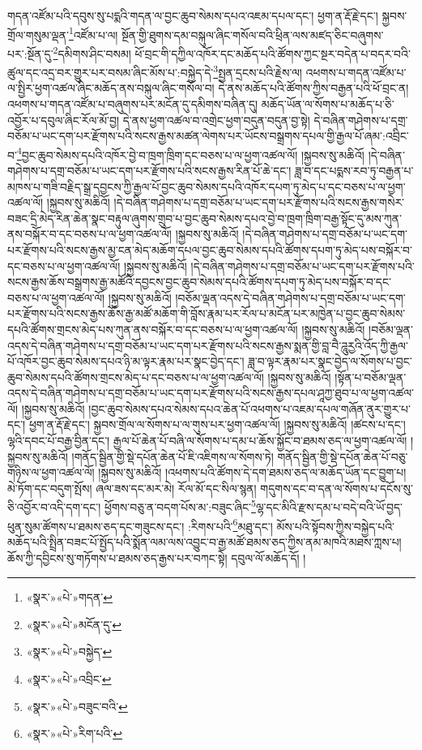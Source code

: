 གདན་འཛོམ་པའི་དབུས་སུ་པདྨའི་གདན་ལ་བྱང་ཆུབ་སེམས་དཔའ་འཇམ་དཔལ་དང་། ཕྱག་ན་རྡོ་རྗེ་དང་། སྐྱབས་གྲོལ་གསུམ་ལྡན་\footnote{«སྣར་»«པེ་»གདན་}འཛོམ་པ་ལ། སྔོན་གྱི་ཐུགས་དམ་བསྐུལ་ཞིང་གསོལ་བའི་ཕྲིན་ལས་མཛད་ཅིང་བཞུགས་པར་:སྔོན་དུ་\footnote{«སྣར་»«པེ་»མངོན་དུ་}དམིགས་ཤིང་བསམ། ཕོ་བྲང་གི་དཀྱིལ་འཁོར་དང་མཆོད་པའི་ཚོགས་ཀྱང་སྔར་བདེན་པ་བདར་བའི་ཚུལ་དང་འདྲ་བར་གྱུར་པར་བསམ་ཞིང་མོས་པ་:བསྐྱེད་དེ་\footnote{«སྣར་»«པེ་»བསྐྱེད་}སྤྱན་དྲངས་པའི་རྗེས་ལ། འཕགས་པ་གདན་འཛོམ་པ་ལ་སྤྱིར་ཕྱག་འཚལ་ཞིང་མཆོད་ནས་བསྐུལ་ཞིང་གསོལ་བ། དེ་ནས་མཆོད་པའི་ཚོགས་ཀྱིས་བརྒྱན་པའི་ཕོ་བྲང་ན། འཕགས་པ་གདན་འཛོམ་པ་བཞུགས་པར་མངོན་དུ་དམིགས་བཞིན་དུ། མཆོད་ཡོན་ལ་སོགས་པ་མཆོད་པ་ཅི་འབྱོར་པ་དབུལ་ཞིང་རོལ་མོ་བྱ། དེ་ནས་ཕྱག་འཚལ་བ་འགྲེང་ཕྱག་བདུན་བདུན་བྱ་སྟེ། དེ་བཞིན་གཤེགས་པ་དགྲ་བཅོམ་པ་ཡང་དག་པར་རྫོགས་པའི་སངས་རྒྱས་མཚན་ལེགས་པར་ཡོངས་བསྒྲགས་དཔལ་གྱི་རྒྱལ་པོ་ཞམ་:འབྲིང་བ་\footnote{«སྣར་»«པེ་»འབྲིང་}བྱང་ཆུབ་སེམས་དཔའི་འཁོར་བྱེ་བ་ཁྲག་ཁྲིག་དང་བཅས་པ་ལ་ཕྱག་འཚལ་ལོ། །སྐྱབས་སུ་མཆིའོ། །དེ་བཞིན་གཤེགས་པ་དགྲ་བཅོམ་པ་ཡང་དག་པར་རྫོགས་པའི་སངས་རྒྱས་རིན་པོ་ཆེ་དང་། ཟླ་བ་དང་པདྨས་རབ་ཏུ་བརྒྱན་པ་མཁས་པ་གཟི་བརྗིད་སྒྲ་དབྱངས་ཀྱི་རྒྱལ་པོ་བྱང་ཆུབ་སེམས་དཔའི་འཁོར་དཔག་ཏུ་མེད་པ་དང་བཅས་པ་ལ་ཕྱག་འཚལ་ལོ། །སྐྱབས་སུ་མཆིའོ། །དེ་བཞིན་གཤེགས་པ་དགྲ་བཅོམ་པ་ཡང་དག་པར་རྫོགས་པའི་སངས་རྒྱས་གསེར་བཟང་དྲི་མེད་རིན་ཆེན་སྣང་བརྟུལ་ཞུགས་གྲུབ་པ་བྱང་ཆུབ་སེམས་དཔའ་བྱེ་བ་ཁྲག་ཁྲིག་བརྒྱ་སྟོང་དུ་མས་ཀུན་ནས་བསྐོར་བ་དང་བཅས་པ་ལ་ཕྱག་འཚལ་ལོ། །སྐྱབས་སུ་མཆིའོ། །དེ་བཞིན་གཤེགས་པ་དགྲ་བཅོམ་པ་ཡང་དག་པར་རྫོགས་པའི་སངས་རྒྱས་མྱ་ངན་མེད་མཆོག་དཔལ་བྱང་ཆུབ་སེམས་དཔའི་ཚོགས་དཔག་ཏུ་མེད་པས་བསྐོར་བ་དང་བཅས་པ་ལ་ཕྱག་འཚལ་ལོ། །སྐྱབས་སུ་མཆིའོ། །དེ་བཞིན་གཤེགས་པ་དགྲ་བཅོམ་པ་ཡང་དག་པར་རྫོགས་པའི་སངས་རྒྱས་ཆོས་བསྒྲགས་རྒྱ་མཚོའི་དབྱངས་བྱང་ཆུབ་སེམས་དཔའི་ཚོགས་དཔག་ཏུ་མེད་པས་བསྐོར་བ་དང་བཅས་པ་ལ་ཕྱག་འཚལ་ལོ། །སྐྱབས་སུ་མཆིའོ། །བཅོམ་ལྡན་འདས་དེ་བཞིན་གཤེགས་པ་དགྲ་བཅོམ་པ་ཡང་དག་པར་རྫོགས་པའི་སངས་རྒྱས་ཆོས་རྒྱ་མཚོ་མཆོག་གི་བློས་རྣམ་པར་རོལ་པ་མངོན་པར་མཁྱེན་པ་བྱང་ཆུབ་སེམས་དཔའི་ཚོགས་གྲངས་མེད་པས་ཀུན་ནས་བསྐོར་བ་དང་བཅས་པ་ལ་ཕྱག་འཚལ་ལོ། །སྐྱབས་སུ་མཆིའོ། །བཅོམ་ལྡན་འདས་དེ་བཞིན་གཤེགས་པ་དགྲ་བཅོམ་པ་ཡང་དག་པར་རྫོགས་པའི་སངས་རྒྱས་སྨན་གྱི་བླ་བཻ་ཌཱུརྱའི་འོད་ཀྱི་རྒྱལ་པོ་འཁོར་བྱང་ཆུབ་སེམས་དཔའ་ཉི་མ་ལྟར་རྣམ་པར་སྣང་བྱེད་དང་། ཟླ་བ་ལྟར་རྣམ་པར་སྣང་བྱེད་ལ་སོགས་པ་བྱང་ཆུབ་སེམས་དཔའི་ཚོགས་གྲངས་མེད་པ་དང་བཅས་པ་ལ་ཕྱག་འཚལ་ལོ། །སྐྱབས་སུ་མཆིའོ། །སྟོན་པ་བཅོམ་ལྡན་འདས་དེ་བཞིན་གཤེགས་པ་དགྲ་བཅོམ་པ་ཡང་དག་པར་རྫོགས་པའི་སངས་རྒྱས་དཔལ་ཤཱཀྱ་ཐུབ་པ་ལ་ཕྱག་འཚལ་ལོ། །སྐྱབས་སུ་མཆིའོ། །བྱང་ཆུབ་སེམས་དཔའ་སེམས་དཔའ་ཆེན་པོ་འཕགས་པ་འཇམ་དཔལ་གཞོན་ནུར་གྱུར་པ་དང་། ཕྱག་ན་རྡོ་རྗེ་དང་། སྐྱབས་གྲོལ་ལ་སོགས་པ་ལ་གུས་པར་ཕྱག་འཚལ་ལོ། །སྐྱབས་སུ་མཆིའོ། །ཚངས་པ་དང་། ལྷའི་དབང་པོ་བརྒྱ་བྱིན་དང་། རྒྱལ་པོ་ཆེན་པོ་བཞི་ལ་སོགས་པ་དམ་པ་ཆོས་སྐྱོང་བ་ཐམས་ཅད་ལ་ཕྱག་འཚལ་ལོ། །སྐྱབས་སུ་མཆིའོ། །གནོད་སྦྱིན་གྱི་སྡེ་དཔོན་ཆེན་པོ་ཇི་འཇིགས་ལ་སོགས་ཏེ། གནོད་སྦྱིན་གྱི་སྡེ་དཔོན་ཆེན་པོ་བཅུ་གཉིས་ལ་ཕྱག་འཚལ་ལོ། །སྐྱབས་སུ་མཆིའོ། །འཕགས་པའི་ཚོགས་དེ་དག་ཐམས་ཅད་ལ་མཆོད་ཡོན་དང་བྱུག་པ། མེ་ཏོག་དང་བདུག་སྤོས། ཞལ་ཟས་དང་མར་མེ། རོལ་མོ་དང་སིལ་སྙན། གདུགས་དང་བ་དན་ལ་སོགས་པ་དངོས་སུ་ཅི་འབྱོར་བ་འདི་དག་དང་། ཕྱོགས་བཅུ་ན་བདག་པོས་མ་:བཟུང་ཞིང་\footnote{«སྣར་»«པེ་»བཟུང་བའི་}ལྷ་དང་མིའི་རྫས་དམ་པ་བདེ་བའི་ཡོ་བྱད་ཕུན་སུམ་ཚོགས་པ་ཐམས་ཅད་དང་གཟུངས་དང་། :རིགས་པའི་\footnote{«སྣར་»«པེ་»རིག་པའི་}མཐུ་དང་། མོས་པའི་སྟོབས་ཀྱིས་བསྐྱེད་པའི་མཆོད་པའི་སྤྲིན་བཟང་པོ་སྤྱོད་པའི་སྨོན་ལམ་ལས་འབྱུང་བ་རྒྱ་མཚོ་ཐམས་ཅད་ཀྱིས་ནམ་མཁའི་མཐས་ཀླས་པ། ཆོས་ཀྱི་དབྱིངས་སུ་གཏོགས་པ་ཐམས་ཅད་རྒྱས་པར་བཀང་སྟེ། དབུལ་ལོ་མཆོད་དོ། །
